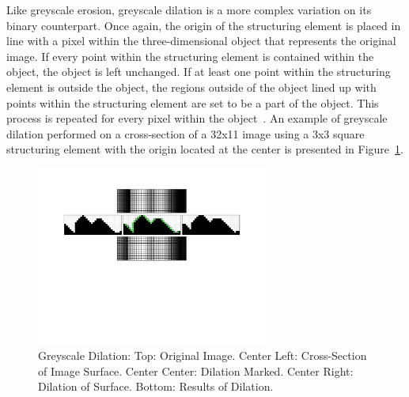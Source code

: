 \documentclass{sig-alternate}
\begin{document}
Like greyscale erosion, greyscale dilation is a more complex variation on its binary counterpart. Once again, the origin of the structuring element is placed in line with a pixel within the three-dimensional object that represents the original image. If every point within the structuring element is contained within the object, the object is left unchanged. If at least one point within the structuring element is outside the object, the regions outside of the object lined up with points within the structuring element are set to be a part of the object. This process is repeated for every pixel within the object~\cite{MorphologyPaper:1987, MorphologyWiki}. An example of greyscale dilation performed on a cross-section of a 32x11 image using a 3x3 square structuring element with the origin located at the center is presented in Figure~\ref{greyscale dilation figure}.
\begin{figure}
\centering
\includegraphics[width=3in,trim={0 4in 0 0},clip]{greyscale_dilation}
\caption{Greyscale Dilation: Top: Original Image. Center Left: Cross-Section of Image Surface. Center Center: Dilation Marked. Center Right: Dilation of Surface. Bottom: Results of Dilation.}
\label{greyscale dilation figure}
\end{figure}
\end{document}
